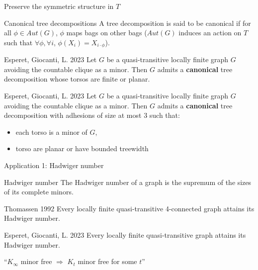 \documentclass[11pt,dvipsnames,presentation,aspectratio=169]{beamer}
\begin{document}
\begin{frame}{Preserve the symmetric structure in $T$}
  \begin{exampleblock}{Canonical tree decompositions}
    A tree decomposition is said to be canonical if for all $\phi \in Aut(G)$,
    $\phi$ maps bags on other bags ($Aut(G)$ induces an action on $T$ such that
    $\forall \phi, \forall i$, $\phi(X_i) = X_{i\cdot\phi}$).
  \end{exampleblock}
  
  \pause
  \begin{block}{Esperet, Giocanti, L. 2023}
    Let $G$ be a quasi-transitive locally finite graph $G$ avoiding the
    countable clique as a minor. Then $G$ admits a {\bf canonical} tree
    decomposition whose torsos are finite or planar.
  \end{block}

  \pause
  \begin{block}{Esperet, Giocanti, L. 2023}
    Let $G$ be a quasi-transitive locally finite graph $G$ avoiding the
    countable clique as a minor. Then $G$ admits a {\bf canonical} tree
    decomposition with adhesions of size at most 3 such that:
    \begin{itemize}
    \item each torso is a minor of $G$,
    \item torso are planar or have bounded treewidth
    \end{itemize}
  \end{block}
\end{frame}

\begin{frame}{Application 1: Hadwiger number}
  \begin{exampleblock}{Hadwiger number}
    The Hadwiger number of a graph is the supremum of the sizes of its complete minors.
  \end{exampleblock}

  \begin{block}{Thomassen 1992}
    Every locally finite quasi-transitive 4-connected graph attains its Hadwiger number.
  \end{block}

  \begin{block}{Esperet, Giocanti, L. 2023}
    Every locally finite quasi-transitive graph attains its Hadwiger number.
  \end{block}

  \centering
  ``$K_\infty$ minor free $\Rightarrow$ $K_t$ minor free for some $t$''
\end{frame}
\end{document}
